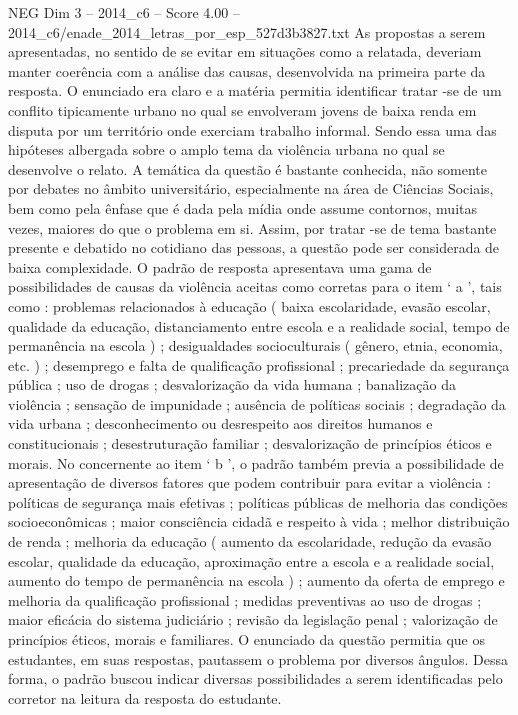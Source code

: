 \begin{textsample}{NEG Dim 3 – 2014\_c6 – Score 4.00 – 2014\_c6/enade\_2014\_letras\_por\_esp\_527d3b3827.txt}
As propostas a serem apresentadas, no sentido de se evitar em situações como a relatada, deveriam manter coerência com a análise das causas, desenvolvida na primeira parte da resposta.
O enunciado era claro e a matéria permitia identificar tratar -se de um conflito tipicamente urbano no qual se envolveram jovens de baixa renda em disputa por um território onde exerciam trabalho informal.
Sendo essa uma das hipóteses albergada sobre o amplo tema da violência urbana no qual se desenvolve o relato.
A temática da questão é bastante conhecida, não somente por debates no âmbito universitário, especialmente na área de Ciências Sociais, bem como pela ênfase que é dada pela mídia onde assume contornos, muitas vezes, maiores do que o problema em si.
Assim, por tratar -se de tema bastante presente e debatido no cotidiano das pessoas, a questão pode ser considerada de baixa complexidade.
O padrão de resposta apresentava uma gama de possibilidades de causas da violência aceitas como corretas para o item ‘ a ’, tais como : problemas relacionados à educação ( baixa escolaridade, evasão escolar, qualidade da educação, distanciamento entre escola e a realidade social, tempo de permanência na escola ) ; desigualdades socioculturais ( gênero, etnia, economia, etc. ) ; desemprego e falta de qualificação profissional ; precariedade da segurança pública ; uso de drogas ; desvalorização da vida humana ; banalização da violência ; sensação de impunidade ; ausência de políticas sociais ; degradação da vida urbana ; desconhecimento ou desrespeito aos direitos humanos e constitucionais ; desestruturação familiar ; desvalorização de princípios éticos e morais.
No concernente ao item ‘ b ’, o padrão também previa a possibilidade de apresentação de diversos fatores que podem contribuir para evitar a violência : políticas de segurança mais efetivas ; políticas públicas de melhoria das condições socioeconômicas ; maior consciência cidadã e respeito à vida ; melhor distribuição de renda ; melhoria da educação ( aumento da escolaridade, redução da evasão escolar, qualidade da educação, aproximação entre a escola e a realidade social, aumento do tempo de permanência na escola ) ; aumento da oferta de emprego e melhoria da qualificação profissional ; medidas preventivas ao uso de drogas ; maior eficácia do sistema judiciário ; revisão da legislação penal ; valorização de princípios éticos, morais e familiares.
O enunciado da questão permitia que os estudantes, em suas respostas, pautassem o problema por diversos ângulos.
Dessa forma, o padrão buscou indicar diversas possibilidades a serem identificadas pelo corretor na leitura da resposta do estudante.

\end{textsample}

